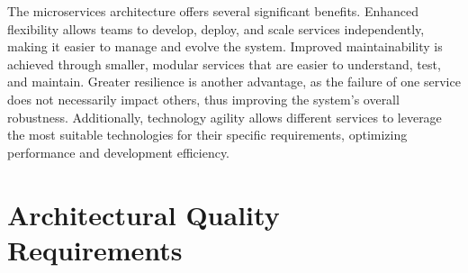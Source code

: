 \documentclass{article}
\begin{document}
The microservices architecture offers several significant benefits. Enhanced flexibility
allows teams to develop, deploy, and scale services independently, making it easier to
manage and evolve the system. Improved maintainability is achieved through smaller,
modular services that are easier to understand, test, and maintain. Greater resilience is
another advantage, as the failure of one service does not necessarily impact others,
thus improving the system's overall robustness. Additionally, technology agility allows
different services to leverage the most suitable technologies for their specific
requirements, optimizing performance and development efficiency.

\section{Architectural Quality Requirements}
\end{document}
